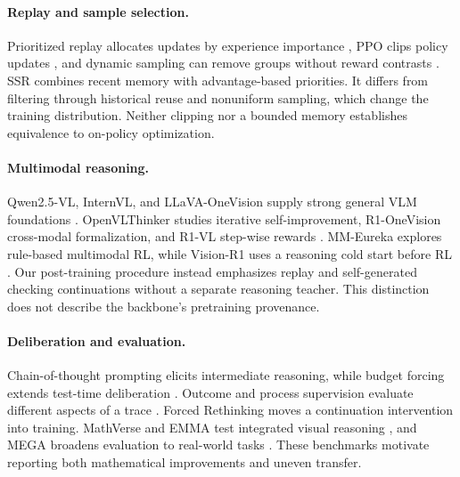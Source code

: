 \documentclass[10pt,twocolumn]{article}
\begin{document}
\paragraph{Replay and sample selection.}
Prioritized replay allocates updates by experience importance \citep{per}, PPO clips policy updates \citep{ppo}, and dynamic sampling can remove groups without reward contrasts \citep{dapo}. SSR combines recent memory with advantage-based priorities. It differs from filtering through historical reuse and nonuniform sampling, which change the training distribution. Neither clipping nor a bounded memory establishes equivalence to on-policy optimization.

\paragraph{Multimodal reasoning.}
Qwen2.5-VL, InternVL, and LLaVA-OneVision supply strong general VLM foundations \citep{qwen2_5_vl,internvl_2_5,llavaov}. OpenVLThinker studies iterative self-improvement, R1-OneVision cross-modal formalization, and R1-VL step-wise rewards \citep{OpenVLThinker,R1OneVision,r1vl}. MM-Eureka explores rule-based multimodal RL, while Vision-R1 uses a reasoning cold start before RL \citep{mmeureka,vision-r1}. Our post-training procedure instead emphasizes replay and self-generated checking continuations without a separate reasoning teacher. This distinction does not describe the backbone's pretraining provenance.

\paragraph{Deliberation and evaluation.}
Chain-of-thought prompting elicits intermediate reasoning, while budget forcing extends test-time deliberation \citep{wei2022chain,s1}. Outcome and process supervision evaluate different aspects of a trace \citep{letsverify}. Forced Rethinking moves a continuation intervention into training. MathVerse and EMMA test integrated visual reasoning \citep{mathverse,emma}, and MEGA broadens evaluation to real-world tasks \citep{chen2024mega}. These benchmarks motivate reporting both mathematical improvements and uneven transfer.
\end{document}
